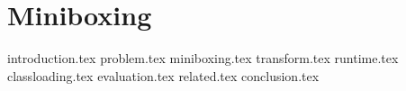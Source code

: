\chapter{Miniboxing}
\label{chapter:miniboxing}

{introduction.tex}
{problem.tex}
{miniboxing.tex}
{transform.tex}
{runtime.tex}
{classloading.tex}
{evaluation.tex}
{related.tex}
{conclusion.tex}

%
%
%
